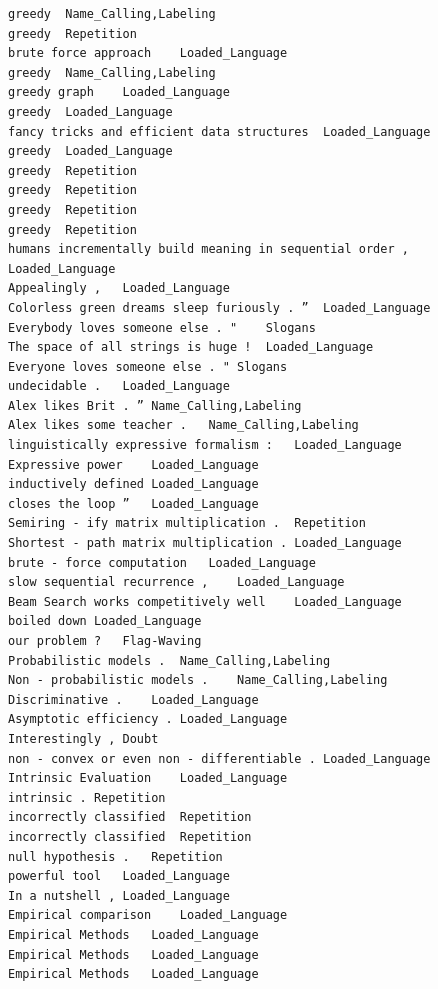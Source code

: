 \documentclass[11pt]{article}
\begin{document}
\begin{appendices}
\begin{verbatim}
greedy	Name_Calling,Labeling
greedy	Repetition
brute force approach	Loaded_Language
greedy	Name_Calling,Labeling
greedy graph	Loaded_Language
greedy	Loaded_Language
fancy tricks and efficient data structures	Loaded_Language
greedy	Loaded_Language
greedy	Repetition
greedy	Repetition
greedy	Repetition
greedy	Repetition
humans incrementally build meaning in sequential order ,	Loaded_Language
Appealingly ,	Loaded_Language
Colorless green dreams sleep furiously . ”	Loaded_Language
Everybody loves someone else . "	Slogans
The space of all strings is huge !	Loaded_Language
Everyone loves someone else . "	Slogans
undecidable .	Loaded_Language
Alex likes Brit . ”	Name_Calling,Labeling
Alex likes some teacher .	Name_Calling,Labeling
linguistically expressive formalism :	Loaded_Language
Expressive power	Loaded_Language
inductively defined	Loaded_Language
closes the loop ”	Loaded_Language
Semiring - ify matrix multiplication .	Repetition
Shortest - path matrix multiplication .	Loaded_Language
brute - force computation	Loaded_Language
slow sequential recurrence ,	Loaded_Language
Beam Search works competitively well	Loaded_Language
boiled down	Loaded_Language
our problem ?	Flag-Waving
Probabilistic models .	Name_Calling,Labeling
Non - probabilistic models .	Name_Calling,Labeling
Discriminative .	Loaded_Language
Asymptotic efficiency .	Loaded_Language
Interestingly ,	Doubt
non - convex or even non - differentiable .	Loaded_Language
Intrinsic Evaluation	Loaded_Language
intrinsic .	Repetition
incorrectly classified	Repetition
incorrectly classified	Repetition
null hypothesis .	Repetition
powerful tool	Loaded_Language
In a nutshell ,	Loaded_Language
Empirical comparison	Loaded_Language
Empirical Methods	Loaded_Language
Empirical Methods	Loaded_Language
Empirical Methods	Loaded_Language
\end{verbatim}

\pagebreak

\end{appendices}
\end{document}
